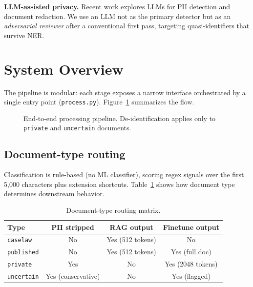 \documentclass[11pt,a4paper]{article}
\begin{document}
\textbf{LLM-assisted privacy.} Recent work explores LLMs for PII detection and document redaction. We use an LLM not as the primary detector but as an \emph{adversarial reviewer} after a conventional first pass, targeting quasi-identifiers that survive NER.

\section{System Overview}

The pipeline is modular: each stage exposes a narrow interface orchestrated by a single entry point (\texttt{process.py}). Figure~\ref{fig:pipeline} summarizes the flow.

\begin{figure}[ht]
\centering
{}
\caption{End-to-end processing pipeline. De-identification applies only to \texttt{private} and \texttt{uncertain} documents.}
\label{fig:pipeline}
\end{figure}

\subsection{Document-type routing}

Classification is rule-based (no ML classifier), scoring regex signals over the first 5{,}000 characters plus extension shortcuts. Table~\ref{tab:routing} shows how document type determines downstream behavior.

\begin{table}[ht]
\centering
\caption{Document-type routing matrix.}
\label{tab:routing}
\begin{tabular}{@{}lccc@{}}
\toprule
\textbf{Type} & \textbf{PII stripped} & \textbf{RAG output} & \textbf{Finetune output} \\
\midrule
\texttt{caselaw}     & No  & Yes (512 tokens)  & No \\
\texttt{published}   & No  & Yes (512 tokens)  & Yes (full doc) \\
\texttt{private}     & Yes & No                & Yes (2048 tokens) \\
\texttt{uncertain}   & Yes (conservative) & No & Yes (flagged) \\
\bottomrule
\end{tabular}
\end{table}
\end{document}
